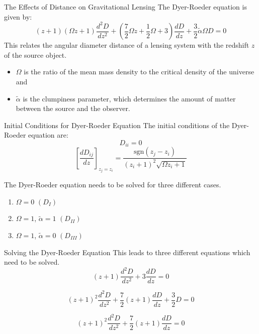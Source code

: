 \documentclass[aspectratio=1610,xcolor=dvipsnames,t]{beamer}
\begin{document}

\begin{frame}{The Effects of Distance on Gravitational Lensing}
The Dyer-Roeder equation is given by:
\begin{equation}
    (z+1)(\Omega z + 1) \frac{d^2D}{dz^2} + 
    \left( \frac{7}{2}\Omega z + \frac{1}{2}\Omega + 3 \right) \frac{dD}{dz} + 
    \frac{3}{2} \tilde{\alpha} \Omega D = 0
\end{equation}
This relates the angular diameter distance of a lensing system with the
redshift $z$ of the source object.
\begin{itemize}
    \item $\Omega$ is the ratio of the mean mass density to the critical
          density of the universe and
    \item $\tilde{\alpha}$ is the clumpiness parameter, which determines
          the amount of matter between the source and the observer.
\end{itemize}
\end{frame} 

\begin{frame}{Initial Conditions for Dyer-Roeder Equation} 
The initial conditions of the Dyer-Roeder equation are:
\begin{equation}
    D_{ii} = 0
\end{equation}
\begin{equation}
    \left[ \frac{dD_{ij}}{dz} \right]_{z_j = z_i} =
         \frac{\mathrm{sgn} (z_j - z_i)}{(z_i + 1)^2 \sqrt{\Omega z_i + 1} }
\end{equation}

The Dyer-Roeder equation needs to be solved for three different cases.
\begin{enumerate}
    \item  $\Omega = 0$ $(D_{I})$
    \item  $\Omega = 1$, $\tilde{\alpha} = 1$ $(D_{II})$
    \item  $\Omega = 1$, $\tilde{\alpha} = 0$ $(D_{III})$
\end{enumerate}
\end{frame} 

\begin{frame}{Solving the Dyer-Roeder Equation} 
This leads to three different equations which need to be solved.
\begin{equation}
    (z+1)\frac{d^2D}{dz^2} + 3 \frac{dD}{dz} = 0
\end{equation}

\begin{equation}
    (z+1)^2 \frac{d^2D}{dz^2} + \frac{7}{2}(z+1)\frac{dD}{dz} + \frac{3}{2}D = 0
\end{equation}

\begin{equation}
    (z+1)^2 \frac{d^2D}{dz^2} + \frac{7}{2}(z+1)\frac{dD}{dz} = 0
\end{equation}
\end{frame} 
\end{document}
